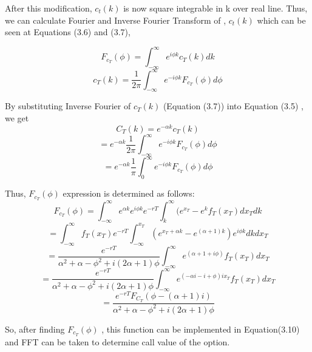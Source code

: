 \documentclass[fontsize=12pt]{article}
\numberwithin{equation}{section} %
\numberwithin{figure}{section} %
\numberwithin{table}{section} %
\begin{document}
After this modification, $c_t(k)$ is now square integrable in k over real line. Thus, we can calculate Fourier and Inverse Fourier Transform of , $c_t(k)$ which can be seen at Equations (3.6) and (3.7),


\begin{equation}
F_{c_T}(\phi)=\int_{-\infty}^{\infty }e^{	i \phi k} c_T(k)dk
\end{equation}
\begin{equation}
c_T(k)=\dfrac{1}{2\pi} \int_{-\infty}^{\infty }	e^{-i \phi k} F_{c_T}(\phi)d\phi
\end{equation}

By substituting  Inverse Fourier of $c_T(k)$ (Equation (3.7)) into Equation (3.5) , we get
\begin{equation}
C_T(k)=e^{-\alpha k} c_T(k)
\end{equation}
\begin{equation}
=e^{-\alpha k} \dfrac{1}{2\pi} \int_{-\infty}^{\infty }e^{-i \phi k} F_{c_T}(\phi)d\phi
\end{equation}
\begin{equation}
=e^{-\alpha k} \dfrac{1}{\pi} \int_{0}^{\infty }e^{-i \phi k} F_{c_T}(\phi)d\phi
\end{equation}

Thus, $F_{c_T}(\phi)$ expression is determined as follows:
\begin{equation}
F_{c_T}(\phi)=\int_{-\infty}^{\infty }e^{\alpha k} e^{i \phi k} e^{-r T}\int_{k}^{\infty }(e^{x_T}-e^{k}f_T(x_T)dx_Tdk
\end{equation}
\begin{equation}
=\int_{-\infty}^{\infty }f_T(x_T) e^{-r T}\int_{-\infty}^{x_T }(e^{x_T+\alpha k}-e^{(\alpha+1)k}) e^{i \phi k}dkdx_T
\end{equation}
\begin{equation}
=\dfrac{e^{-r T}}{\alpha^2+\alpha-\phi^2+i(2\alpha+1)\phi}\int_{-\infty}^{\infty }e^{(\alpha+1+i\phi)}f_T(x_T)dx_T
\end{equation}
\begin{equation}
=\dfrac{e^{-r T}}{\alpha^2+\alpha-\phi^2+i(2\alpha+1)\phi}\int_{-\infty}^{\infty }e^{(-\alpha i-i+\phi)ix_T}f_T(x_T)dx_T
\end{equation}
\begin{equation}
=\dfrac{e^{-r T}F_{C_T}(\phi-(\alpha+1)i)}	{\alpha^2+\alpha-\phi^2+i(2\alpha+1)\phi}
\end{equation}

So, after finding $F_{c_T}(\phi)$ , this function can be implemented in Equation(3.10) and FFT can be taken to determine call value of the option. 
\end{document}

